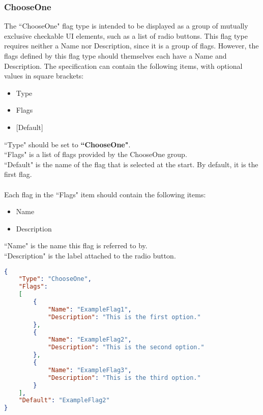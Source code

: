 \documentclass{article}
\begin{document}
\subsubsection{ChooseOne}
The ``ChooseOne" flag type is intended to be displayed as a group of mutually exclusive checkable UI elements, such as a list of radio buttons. This flag type requires neither a Name nor Description, since it is a group of flags. However, the flags defined by this flag type should themselves each have a Name and Description. The specification can contain the following items, with optional values in square brackets:
\begin{itemize}
\item Type
\item Flags
\item {[Default]}
\end{itemize}
``Type" should be set to \textbf{``ChooseOne"}.\\
``Flags" is a list of flags provided by the ChooseOne group.\\
``Default" is the name of the flag that is selected at the start. By default, it is the first flag.\\\\
Each flag in the ``Flags" item should contain the following items:
\begin{itemize}
\item Name
\item Description
\end{itemize}
``Name" is the name this flag is referred to by.\\
``Description" is the label attached to the radio button.\\
\newpage
\begin{lstlisting}[language=json,firstnumber=1]
{
    "Type": "ChooseOne",
    "Flags":
    [
        {
            "Name": "ExampleFlag1",
            "Description": "This is the first option."
        },
        {
            "Name": "ExampleFlag2",
            "Description": "This is the second option."
        },
        {
            "Name": "ExampleFlag3",
            "Description": "This is the third option."
        }
    ],
    "Default": "ExampleFlag2"
}
\end{lstlisting}
\newpage
\end{document}
